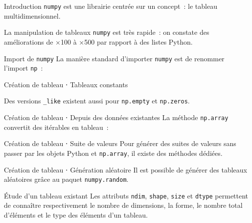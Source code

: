 \begin{frame}{Introduction}
  \texttt{numpy} est une librairie centrée sur un concept~: le tableau multidimensionnel.

  La manipulation de tableaux \texttt{numpy} est très rapide~: on constate des améliorations de ×100 à ×500 par rapport à des listes Python.
\end{frame}

\begin{frame}{Import de \texttt{numpy}}
  La manière standard d'importer \texttt{numpy} est de renommer l'import \texttt{np}~:

\end{frame}

\begin{frame}{Création de tableau ⋅ Tableaux constants}

  Des versions \texttt{\_like} existent aussi pour \texttt{np.empty} et \texttt{np.zeros}.
\end{frame}

\begin{frame}{Création de tableau ⋅ Depuis des données existantes}
  La méthode \texttt{np.array} convertit des itérables en tableau~:

\end{frame}

\begin{frame}{Création de tableau ⋅ Suite de valeurs}
  Pour générer des suites de valeurs sans passer par les objets Python et \texttt{np.array}, il existe des méthodes dédiées.
\end{frame}

\begin{frame}{Création de tableau ⋅ Génération aléatoire}
  Il est possible de générer des tableaux aléatoires grâce au paquet \texttt{numpy.random}.
\end{frame}

\begin{frame}{Étude d'un tableau existant}
  Les attributs \texttt{ndim}, \texttt{shape}, \texttt{size} et \texttt{dtype} permettent de connaître respectivement le nombre de dimensions, la forme, le nombre total d'éléments et le type des éléments d'un tableau.
\end{frame}


